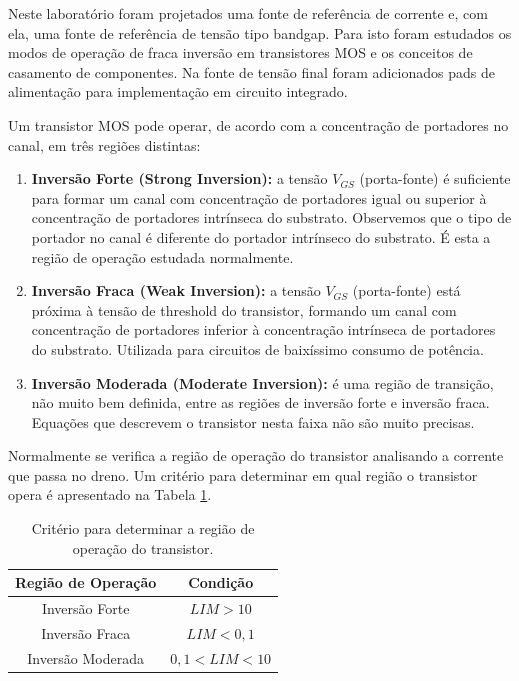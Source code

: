 \documentclass[12pt,a4paper]{article}
\begin{document}
Neste laboratório foram projetados uma fonte de referência de corrente e, com ela, uma fonte de referência de tensão tipo bandgap. Para isto foram estudados os modos de operação de fraca inversão em transistores MOS e os conceitos de casamento de componentes. Na fonte de tensão final foram adicionados pads de alimentação para implementação em circuito integrado.

Um transistor MOS pode operar, de acordo com a concentração de portadores no canal, em três regiões distintas:

\begin{enumerate}
    \item \textbf{Inversão Forte (Strong Inversion):} a tensão $V_{GS}$ (porta-fonte) é suficiente para formar um canal com concentração de portadores igual ou superior à concentração de portadores intrínseca do substrato. Observemos que o tipo de portador no canal é diferente do portador intrínseco do substrato. É esta a região de operação estudada normalmente.

    \item \textbf{Inversão Fraca (Weak Inversion):} a tensão $V_{GS}$ (porta-fonte) está próxima à tensão de threshold do transistor, formando um canal com concentração de portadores inferior à concentração intrínseca de portadores do substrato. Utilizada para circuitos de baixíssimo consumo de potência.

    \item \textbf{Inversão Moderada (Moderate Inversion):} é uma região de transição, não muito bem definida, entre as regiões de inversão forte e inversão fraca. Equações que descrevem o transistor nesta faixa não são muito precisas.
\end{enumerate}

Normalmente se verifica a região de operação do transistor analisando a corrente que passa no dreno. Um critério para determinar em qual região o transistor opera é apresentado na Tabela \ref{tab:operacao}.

\begin{table}[H]
\centering
\caption{Critério para determinar a região de operação do transistor.}
\label{tab:operacao}
\begin{tabular}{cc}
\toprule
\textbf{Região de Operação} & \textbf{Condição} \\
\midrule
Inversão Forte & $LIM > 10$ \\
Inversão Fraca & $LIM < 0,1$ \\
Inversão Moderada & $0,1 < LIM < 10$ \\
\bottomrule
\end{tabular}
\end{table}
\end{document}
